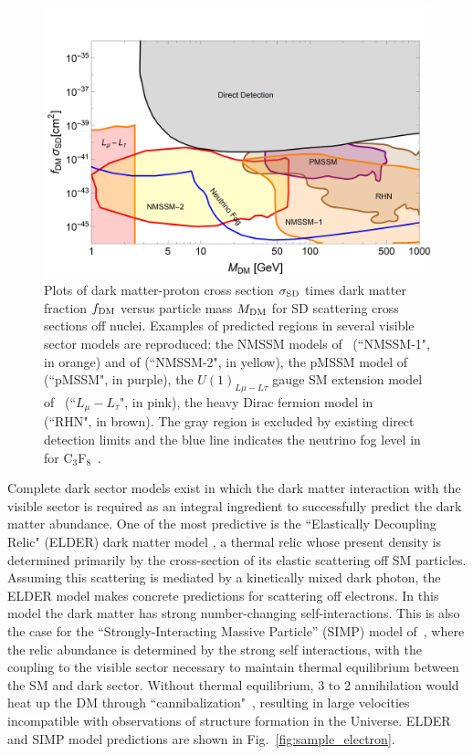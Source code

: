 \begin{figure}[t]
\begin{center}
\includegraphics[width=0.80\columnwidth]{figures/sigmapSD_plot.jpg}
\caption{Plots of dark matter-proton cross section $\sigma_{\rm SD}$  times dark matter fraction $f_{\rm DM}$ versus particle mass $M_{\rm DM}$ for SD scattering cross sections off nuclei. Examples of predicted regions in several visible sector models are reproduced: the NMSSM models of~\cite{Lopez-Fogliani:2021qpq} (``NMSSM-1", in orange) and of \cite{Wang:2020xta} (``NMSSM-2", in yellow), the pMSSM model of~\cite{VanBeekveld:2021tgn} (``pMSSM", in purple), the $U(1)_{L\mu -L\tau}$ gauge SM extension model of~\cite{Singirala:2021gok} (``$L_\mu - L_\tau$", in pink), the heavy Dirac fermion model in~\cite{Barger:2008qd} (``RHN", in brown). The gray region is excluded by existing direct detection limits and the blue line indicates the neutrino fog level in for C$_3$F$_8$~\cite{Ruppin:2014bra}.}
\label{fig:sample_SD-VisibleSector}
\end{center}
\end{figure}

 Complete dark sector models exist in which the dark matter interaction with the visible sector is required as an integral ingredient to successfully predict the dark matter abundance. One of the most predictive is the ``Elastically Decoupling Relic" (ELDER) dark matter model \cite{Kuflik:2015isi, Kuflik:2017iqs}, a thermal relic whose present density is determined primarily by the cross-section of its elastic scattering off SM particles. Assuming this scattering is mediated by a kinetically mixed dark photon, the ELDER model makes concrete predictions for scattering off electrons. In this model the dark matter has strong number-changing self-interactions.  This is also the case for the “Strongly-Interacting Massive Particle” (SIMP) model of~\cite{Hochberg:2014dra}, where the relic abundance is determined by the strong self interactions, with the coupling to the visible sector necessary to maintain thermal equilibrium between the SM and dark sector. Without thermal equilibrium, 3 to 2 annihilation would heat up the DM through ``cannibalization"~\cite{Carlson:1992fn,deLaix:1995vi,Boddy:2014yra}, resulting in large velocities incompatible with observations of structure formation in the Universe. ELDER and SIMP model predictions are shown in Fig.~\ref{fig:sample_electron}.
 
